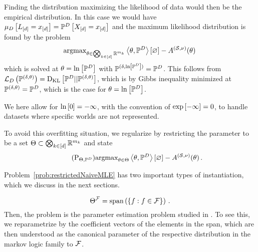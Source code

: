Finding the distribution maximizing the likelihood of data would then be the empirical distribution.
In this case we would have $\mu_{D}\left[L_{[d]}=x_{[d]}\right] = \mathbb{P}^{D}\left[X_{[d]}=x_{[d]}\right]$ and the maximum likelihood distribution is found by the problem
\begin{align*}
    \mathrm{argmax}_{\theta\in\bigotimes_{k\in[d]} \mathbb{R}^{m_{k}}}  \left\langle \theta,\mathbb{P}^{D}\right\rangle \left[ \varnothing \right] - A^{(\mathcal{S},\nu)}(\theta) \,
\end{align*}
which is solved at $\theta=\ln \left[ \mathbb{P}^{D} \right]$ with $\mathbb{P}^{(\delta,\ln \left[ \mathbb{P}^{D} \right])}= \mathbb{P}^{D}$.
This follows from $\mathcal{L}_{D}\left(\mathbb{P}^{(\delta,\theta)}\right)=\mathrm{D}_{\mathrm{KL}}\left[ \mathbb{P}^{D} || \mathbb{P}^{(\delta,\theta)} \right]$, which is by Gibbs inequality minimized at $\mathbb{P}^{(\delta,\theta)}=\mathbb{P}^{D}$, which is the case for $\theta = \ln \left[ \mathbb{P}^{D} \right]$.

We here allow for $\ln \left[ 0 \right]=-\infty$, with the convention of $\mathrm{exp}\left[-\infty\right]=0$, to handle datasets where specific worlds are not represented.


To avoid this overfitting situation, we regularize by restricting the parameter to be a set $\Theta\subset\bigotimes_{k\in[d]} \mathbb{R}^{m_{k}}$ and state
\begin{align}
    \tag{$\mathrm{P}_{\energyhypothesis, \empdistribution}$}\label{prob:restrictedNaiveMLE}
    \argmax_{\canparam\in\energyhypothesis}  \contraction{\canparam,\empdistribution} - \cumfunctionof{\canparam} \, .
\end{align}

Problem~\ref{prob:restrictedNaiveMLE} has two important types of instantiation, which we discuss in the next sections.


\[ \Theta^{\mathcal{F}} = \mathrm{span}\left(\{f : f\in\mathcal{F} \}\right) \, . \]
Then, the problem is the parameter estimation problem studied in .
To see this, we reparametrize by the coefficient vectors of the elements in the span, which are then understood as the canonical parameter of the respective distribution in the markov logic family to $\mathcal{F}$.



